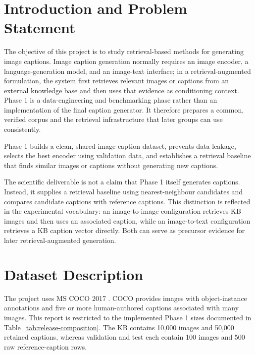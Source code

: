\documentclass{article}
\begin{document}
\setcounter{section}{0}
\section{Introduction and Problem
Statement}\label{introduction-and-problem-statement}

The objective of this project is to study retrieval-based methods for
generating image captions. Image caption generation normally requires an
image encoder, a language-generation model, and an image-text interface;
in a retrieval-augmented formulation, the system first retrieves
relevant images or captions from an external knowledge base and then
uses that evidence as conditioning context. Phase 1 is a
data-engineering and benchmarking phase rather than an implementation of
the final caption generator. It therefore prepares a common, verified
corpus and the retrieval infrastructure that later groups can use
consistently.

Phase 1 builds a clean, shared image-caption dataset, prevents data leakage, selects the best encoder using validation data, and establishes a retrieval baseline that finds similar images or captions without generating new captions.

The scientific deliverable is not a claim that Phase 1 itself generates
captions. Instead, it supplies a retrieval baseline using
nearest-neighbour candidates and compares candidate captions with
reference captions. This distinction is reflected in the experimental
vocabulary: an image-to-image configuration retrieves KB images and then
uses an associated caption, while an image-to-text configuration
retrieves a KB caption vector directly. Both can serve as precursor
evidence for later retrieval-augmented generation.


\section{Dataset Description}\label{dataset-description}

The project uses MS COCO 2017 \cite{fleet_microsoft_2014}. COCO provides images with object-instance
annotations and five or more human-authored captions associated with
many images. This report is restricted to the implemented Phase 1
sizes documented in Table~\ref{tab:release-composition}. The
KB contains 10,000 images and 50,000 retained captions, whereas
validation and test each contain 100 images and 500 raw
reference-caption rows.
\end{document}
